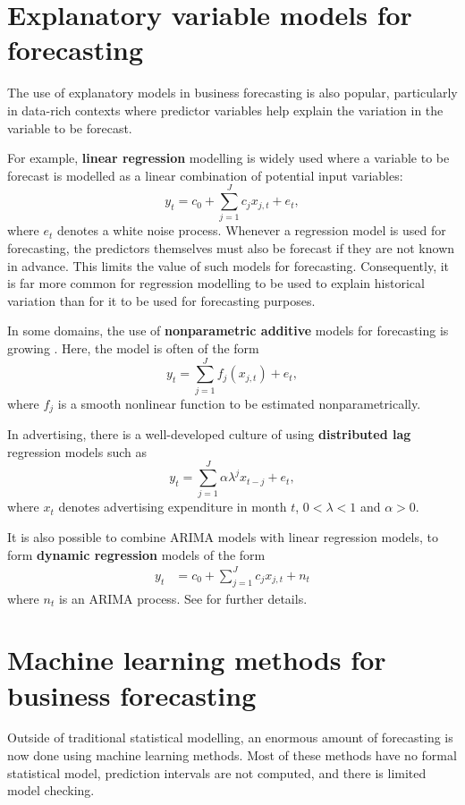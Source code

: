 \documentclass[a4paper,10pt]{article}
\begin{document}
\section{Explanatory variable models for forecasting}

The use of explanatory models in business forecasting is also popular, particularly in data-rich contexts where predictor variables help explain the variation in the variable to be forecast.

For example, \textbf{linear regression} modelling is widely used \citep[e.g.,][]{Pardoe06} where a variable to be forecast is modelled as a linear combination of potential input variables:
\[
	y_t = c_0 + \sum_{j=1}^J c_j x_{j,t} + e_t,
\]
where $e_t$ denotes a white noise process. Whenever a regression model is used for forecasting, the predictors themselves must also be forecast if they are not known in advance. This limits the value of such models for forecasting. Consequently, it is far more common for regression modelling to be used to explain historical variation than for it to be used for forecasting purposes.

In some domains, the use of \textbf{nonparametric additive} models for forecasting is growing \citep[e.g.,][]{HF10}. Here, the model is often of the form
\[
	y_t = \sum_{j=1}^J f_j(x_{j,t}) + e_t,
\]
where $f_j$ is a smooth nonlinear function to be estimated nonparametrically.

In advertising, there is a well-developed culture of using \textbf{distributed lag} regression models \citep[e.g.,][]{HPS01} such as
\[
	y_t = \sum_{j=1}^J \alpha\lambda^j x_{t-j} + e_t,
\]
where $x_t$ denotes advertising expenditure in month $t$, $0<\lambda<1$ and $\alpha>0$.

It is also possible to combine ARIMA models with linear regression models, to form \textbf{dynamic regression} models of the form
\begin{align*}
	y_t &= c_0 + \sum_{j=1}^J c_j x_{j,t} + n_t
\end{align*}
where $n_t$ is an ARIMA process. See \citet{fpp3} for further details.

\section{Machine learning methods for business forecasting}

Outside of traditional statistical modelling, an enormous amount of forecasting is now done using machine learning methods. Most of these methods have no formal statistical model, prediction intervals are not computed, and there is limited model checking.
\end{document}
